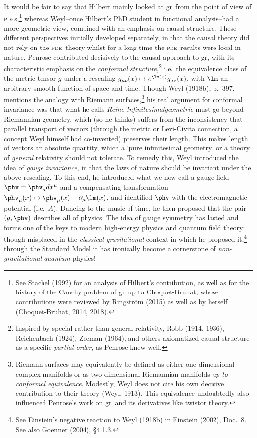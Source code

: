 \documentclass[11pt,a4paper]{article}
\newcommand{\pde}{\textsc{pde}}
\newcommand{\p}{\partial}
\newcommand{\GR}{{\sc gr}}
\begin{document}
 It would be fair to say that Hilbert mainly looked at \GR\ from the point of view of \pde s,\footnote{See 
   Stachel (1992) for an analysis of Hilbert's contribution, as well as for the history of the Cauchy problem of \GR\ up to Choquet-Bruhat, whose contributions were reviewed by  Ringstr\"{o}m (2015) as well as by herself 
    (Choquet-Bruhat, 2014, 2018).} whereas Weyl--once Hilbert's PhD student in functional analysis--had a more geometric view, combined with an emphasis on causal structure.  These different perspectives initially developed  separately, in that the causal theory did not rely on the \pde\ theory whilst for a long time the  \pde\ results were  local in nature.  Penrose contributed decisively to the causal approach to \GR, with its
 characteristic emphasis on the \emph{conformal structure},\footnote{Inspired by special rather than general relativity,  Robb (1914, 1936), Reichenbach (1924),  Zeeman (1964), and  others axiomatized causal structure as a specific \emph{partial order}, as Penrose knew well. } i.e.\ the equivalence class of the metric tensor $g$ under a rescaling $g_{\mu\nu}(x)\mapsto e^{\lm(x)} g_{\mu\nu}(x)$, 
  with $\lm$ an arbitrary smooth function of space and time. Though Weyl (1918b), p.\ 397,  mentions the analogy with Riemann surfaces,\footnote{Riemann surfaces  may equivalently be defined as either one-dimensional complex manifolds or as  two-dimensional Riemannian manifolds \emph{up to conformal equivalence}. 
 Modestly, Weyl does not cite his own decisive contribution to their theory (Weyl, 1913).  This equivalence undoubtedly also influenced Penrose's work on \GR\  and its derivatives like twistor theory. } his real argument for conformal invariance was  that what he calls \emph{Reine Infinitesimalgeometrie} must go beyond Riemannian geometry, which (so he thinks) suffers from the inconsistency that parallel transport of vectors (through the metric or Levi-Civita connection, a concept Weyl himself had co-invented) preserves their length. This makes length of vectors an absolute quantity, which a  `pure infinitesimal geometry' or a theory of \emph{general} relativity should not tolerate. To remedy this, Weyl introduced the idea of \emph{gauge invariance},  in that the laws of nature should be invariant under the above rescaling. To this end, he introduced what we now call a gauge field $\phv=\phv_{\mu}dx^{\mu}$ and
 a compensating transformation $\phv_{\mu}(x)\mapsto  \phv_{\mu}(x)-\p_{\mu} \lm(x)$, and identified $\phv$ with the electromagnetic potential (i.e.\ $A$). Dancing to the music of time, he then proposed that the pair $(g,\phv)$ describes all of physics. The idea of gauge symmetry has lasted and forms one of the keys to modern high-energy physics and quantum field theory: 
   though misplaced in the \emph{classical gravitational} context in which he proposed it,\footnote{See Einstein's negative reaction to Weyl (1918b) in Einstein (2002), Doc.\ 8. See also Goenner (2004), \S 4.1.3. }  through the Standard Model it has ironically become a cornerstone of \emph{non-gravitational quantum} physics! 
\end{document}
